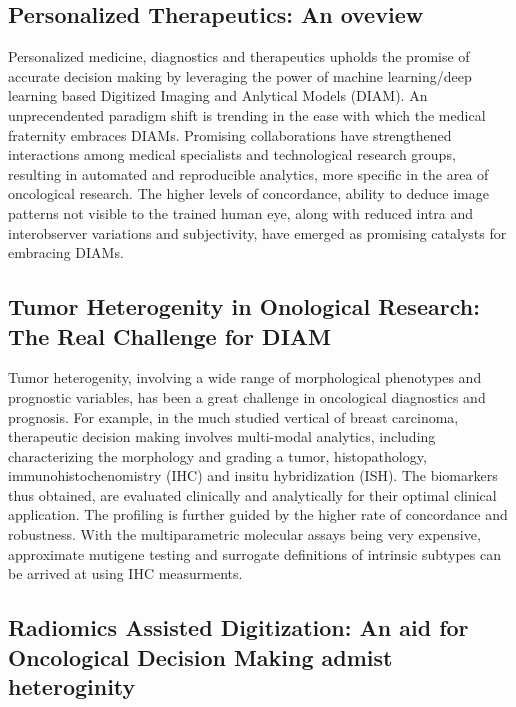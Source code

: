 \documentclass[10pt,journal,compsoc]{IEEEtran}
\begin{document}
\subsection{ Personalized Therapeutics: An oveview}

Personalized medicine, diagnostics and therapeutics upholds the promise of accurate decision making by leveraging the power of machine learning/deep learning based Digitized Imaging and Anlytical Models (DIAM). An unprecendented paradigm shift is trending in the ease with which the medical fraternity embraces DIAMs. Promising collaborations have strengthened interactions among medical specialists and technological research groups, resulting in automated and reproducible analytics, more specific in the area of oncological research. The higher levels of concordance, ability to deduce image patterns not visible to the trained human eye, along with reduced intra and interobserver variations and subjectivity, have emerged as promising catalysts for embracing DIAMs.


\subsection{Tumor Heterogenity in Onological Research: The Real Challenge for DIAM}

Tumor heterogenity, involving a wide range of morphological phenotypes and prognostic variables, has been a great challenge in oncological diagnostics and prognosis. For example, in the much studied vertical of breast carcinoma, therapeutic decision making involves multi-modal analytics, including characterizing the morphology and grading a tumor, histopathology, immunohistochenomistry (IHC) and insitu hybridization (ISH). The biomarkers thus obtained, are evaluated clinically and analytically for their optimal clinical application. The profiling is further guided by the higher rate of concordance and robustness. With the multiparametric molecular assays being very expensive, approximate mutigene testing and surrogate definitions of intrinsic subtypes can be arrived at using IHC measurments.

\subsection{Radiomics Assisted Digitization: An aid for Oncological Decision Making admist heteroginity}
\end{document}
